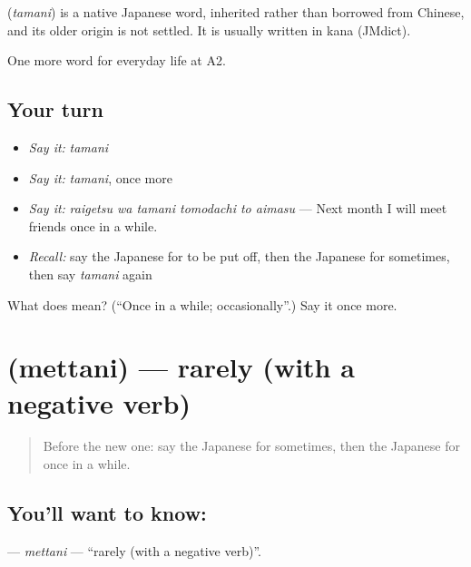 \begin{cousinweb}
\textbf{} (\emph{tamani}) is a native Japanese word, inherited rather than borrowed from Chinese, and its older origin is not settled. It is usually written in kana (JMdict).
\end{cousinweb}

\begin{grammarlens}[title={What you've built}]
One more word for everyday life at A2.
\end{grammarlens}

\subsection*{Your turn}
\begin{itemize}
\raggedright
  \item \emph{Say it:} \emph{tamani}
  \item \emph{Say it:} \emph{tamani}, once more
  \item \emph{Say it:} \emph{raigetsu wa tamani tomodachi to aimasu} — Next month I will meet friends once in a while.
  \item \emph{Recall:} say the Japanese for to be put off, then the Japanese for sometimes, then say \emph{tamani} again
\end{itemize}

\begin{tcolorbox}[breakable,colback=teal!4,colframe=teal!35!black,title={Before you move on}]
What does  mean? (\textquotedblleft{}Once in a while; occasionally\textquotedblright{}.) Say it once more.
\end{tcolorbox}
\section[\texorpdfstring{\ja{めったに} (mettani)}{めったに (mettani)}]{ (mettani) — rarely (with a negative verb)}

\label{lesson:JA-C169-mettani}



\begin{quote}
Before the new one: say the Japanese for sometimes, then the Japanese for once in a while.
\end{quote}

\subsection*{You'll want to know: }
\textbf{} — \emph{mettani} — \textquotedblleft{}rarely (with a negative verb)\textquotedblright{}.


